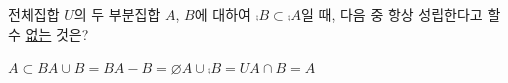 전체집합 $U$의 두 부분집합 $A$, $B$에 대하여 $\comp{B}\subset\comp{A}$일 때, 다음 중 항상 성립한다고 할 수 \underline{없는} 것은?
\begin{choices32}{$A\subset B$}{$A\cup B=B$}{$A-B=\varnothing$}{$A\cup\comp{B}=U$}{$A\cap B=A$}\end{choices32}
